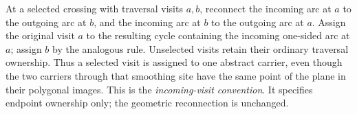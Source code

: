 \begin{convention}\label{conv:selected-visits}\leanok
At a selected crossing with traversal visits $a,b$, reconnect the incoming
arc at $a$ to the outgoing arc at $b$, and the incoming arc at $b$ to the
outgoing arc at $a$. Assign the original visit $a$ to the resulting cycle
containing the incoming one-sided arc at $a$; assign $b$ by the analogous
rule. Unselected visits retain their ordinary traversal ownership.
Thus a selected visit is assigned to one abstract carrier, even though
the two carriers through that smoothing site have the same point of the
plane in their polygonal images. This is the \emph{incoming-visit convention}.
It specifies endpoint ownership only; the geometric reconnection is unchanged.
\end{convention}

